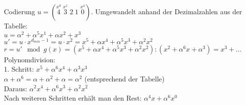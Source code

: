 \documentclass{scrreprt}
\begin{document}
\begin{enumerate}
Codierung $u=(\overset{x^0}{4}\;\overset{x^1}{3}\;2\;1\;\overset{x^4}{0})$. Umgewandelt anhand der Dezimalzahlen aus der Tabelle:\\
$u=\alpha^2 + \alpha^5 x^1 + \alpha x^2 + x^3$\\
$u'=u\cdot x^{d_{min}-1}=u\cdot x^2 = x^5 + \alpha x^4+\alpha^5 x^3 + \alpha^2x^2$\\
$r=u' \mod g(x)= (x^5 + \alpha x^4+\alpha^5 x^3 + \alpha^2x^2):(x^2+\alpha^6x+\alpha^3)=x^3+...$\\
Polynomdivision:\\
1. Schritt: $x^5+\alpha^6x^4+\alpha^3x^3$\\
$\alpha + \alpha^6 = \alpha + \alpha^2+\alpha = \alpha^2$ (entsprechend der Tabelle)\\
Daraus: $\alpha^2 x^4+\alpha^6x^3+\alpha^2x^2$\\
Nach weiteren Schritten erhält man den Rest: $\alpha^4x+\alpha^6x^0$

\end{enumerate}



\end{document}
